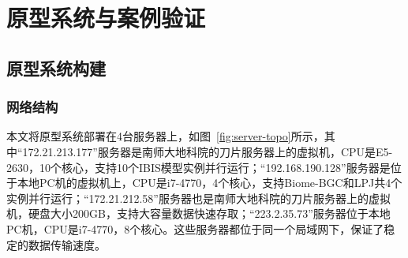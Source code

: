 \chapter{原型系统与案例验证}
\section{原型系统构建}
\subsection{网络结构}
本文将原型系统部署在4台服务器上，如图~\ref{fig:server-topo}所示，其中“172.21.213.177”服务器是南师大地科院的刀片服务器上的虚拟机，CPU是E5-2630，10个核心，支持10个IBIS模型实例并行运行；“192.168.190.128”服务器是位于本地PC机的虚拟机上，CPU是i7-4770，4个核心，支持Biome-BGC和LPJ共4个实例并行运行；“172.21.212.58”服务器也是南师大地科院的刀片服务器上的虚拟机，硬盘大小200GB，支持大容量数据快速存取；“223.2.35.73”服务器位于本地PC机，CPU是i7-4770，8个核心。这些服务器都位于同一个局域网下，保证了稳定的数据传输速度。



